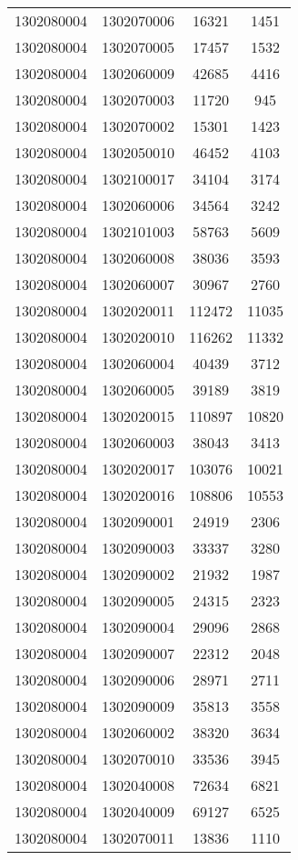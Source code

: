 \begin{longtable}[h]{llcc}
		1302080004 & 1302070006 & 16321 & 1451\\
		1302080004 & 1302070005 & 17457 & 1532\\
		1302080004 & 1302060009 & 42685 & 4416\\
		1302080004 & 1302070003 & 11720 & 945\\
		1302080004 & 1302070002 & 15301 & 1423\\
		1302080004 & 1302050010 & 46452 & 4103\\
		1302080004 & 1302100017 & 34104 & 3174\\
		1302080004 & 1302060006 & 34564 & 3242\\
		1302080004 & 1302101003 & 58763 & 5609\\
		1302080004 & 1302060008 & 38036 & 3593\\
		1302080004 & 1302060007 & 30967 & 2760\\
		1302080004 & 1302020011 & 112472 & 11035\\
		1302080004 & 1302020010 & 116262 & 11332\\
		1302080004 & 1302060004 & 40439 & 3712\\
		1302080004 & 1302060005 & 39189 & 3819\\
		1302080004 & 1302020015 & 110897 & 10820\\
		1302080004 & 1302060003 & 38043 & 3413\\
		1302080004 & 1302020017 & 103076 & 10021\\
		1302080004 & 1302020016 & 108806 & 10553\\
		1302080004 & 1302090001 & 24919 & 2306\\
		1302080004 & 1302090003 & 33337 & 3280\\
		1302080004 & 1302090002 & 21932 & 1987\\
		1302080004 & 1302090005 & 24315 & 2323\\
		1302080004 & 1302090004 & 29096 & 2868\\
		1302080004 & 1302090007 & 22312 & 2048\\
		1302080004 & 1302090006 & 28971 & 2711\\
		1302080004 & 1302090009 & 35813 & 3558\\
		1302080004 & 1302060002 & 38320 & 3634\\
		1302080004 & 1302070010 & 33536 & 3945\\
		1302080004 & 1302040008 & 72634 & 6821\\
		1302080004 & 1302040009 & 69127 & 6525\\
		1302080004 & 1302070011 & 13836 & 1110\\

\end{longtable}
